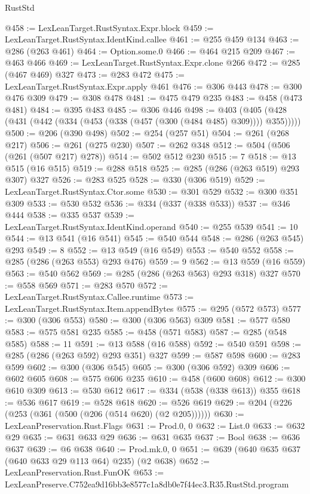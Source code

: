 \begin{lexlean}{RustStd}
\begin{coremodule}
@458 := LexLeanTarget.RustSyntax.Expr.block
@459 := LexLeanTarget.RustSyntax.IdentKind.callee
@461 := @255 @459 @134
@463 := @286 (@263 @461)
@464 := Option.some.{0}
@466 := @464 @215 @209
@467 := @463 @466
@469 := LexLeanTarget.RustSyntax.Expr.clone @266
@472 := @285 (@467 @469) @327
@473 := @283 @472
@475 := LexLeanTarget.RustSyntax.Expr.apply @461
@476 := @306 @443
@478 := @300 @476 @309
@479 := @308 @478
@481 := @475 @479 @235
@483 := @458 (@473 @481)
@484 := @395 @483
@485 := @306 @446
@498 := @403 (@405 (@428 (@431 (@442 (@334 (@453 (@338 (@457 (@300 (@484 @485) @309)))) @355)))))
@500 := @206 (@390 @498)
@502 := @254 (@257 @51)
@504 := @261 (@268 @217)
@506 := @261 (@275 @230)
@507 := @262 @348
@512 := @504 (@506 (@261 (@507 @217) @278))
@514 := @502 @512 @230
@515 := 7
@518 := @13 @515 (@16 @515)
@519 := @288 @518
@525 := @285 (@286 (@263 @519) @293 @307) @327
@526 := @283 @525
@528 := @330 (@306 @519)
@529 := LexLeanTarget.RustSyntax.Ctor.some
@530 := @301 @529
@532 := @300 @351 @309
@533 := @530 @532
@536 := @334 (@337 (@338 @533))
@537 := @346 @444
@538 := @335 @537
@539 := LexLeanTarget.RustSyntax.IdentKind.operand
@540 := @255 @539
@541 := 10
@544 := @13 @541 (@16 @541)
@545 := @540 @544
@548 := @286 (@263 @545) @293
@549 := 8
@552 := @13 @549 (@16 @549)
@553 := @540 @552
@558 := @285 (@286 (@263 @553) @293 @476)
@559 := 9
@562 := @13 @559 (@16 @559)
@563 := @540 @562
@569 := @285 (@286 (@263 @563) @293 @318) @327
@570 := @558 @569
@571 := @283 @570
@572 := LexLeanTarget.RustSyntax.Callee.runtime
@573 := LexLeanTarget.RustSyntax.Item.appendBytes
@575 := @295 (@572 @573)
@577 := @300 (@306 @553)
@580 := @300 (@306 @563) @309
@581 := @577 @580
@583 := @575 @581 @235
@585 := @458 (@571 @583)
@587 := @285 (@548 @585)
@588 := 11
@591 := @13 @588 (@16 @588)
@592 := @540 @591
@598 := @285 (@286 (@263 @592) @293 @351) @327
@599 := @587 @598
@600 := @283 @599
@602 := @300 (@306 @545)
@605 := @300 (@306 @592) @309
@606 := @602 @605
@608 := @575 @606 @235
@610 := @458 (@600 @608)
@612 := @300 @610 @309
@613 := @530 @612
@617 := @334 (@538 (@338 @613)) @355
@618 := @536 @617
@619 := @528 @618
@620 := @526 @619
@629 := @204 (@226 (@253 (@361 (@500 (@206 (@514 @620) (@2 @205))))))
@630 := LexLeanPreservation.Rust.Flags
@631 := Prod.{0, 0}
@632 := List.{0}
@633 := @632 @29
@635 := @631 @633 @29
@636 := @631 @635
@637 := Bool
@638 := @636 @637
@639 := @6 @638
@640 := Prod.mk.{0, 0}
@651 := @639 (@640 @635 @637 (@640 @633 @29 @113 @64) @235) (@2 @638)
@652 := LexLeanPreservation.Rust.FunOK
@653 := LexLeanPreserve.C752ea9d16bb3e8577c1a8db0e7f44ec3.R35.RustStd.program

\end{coremodule}
\end{lexlean}
